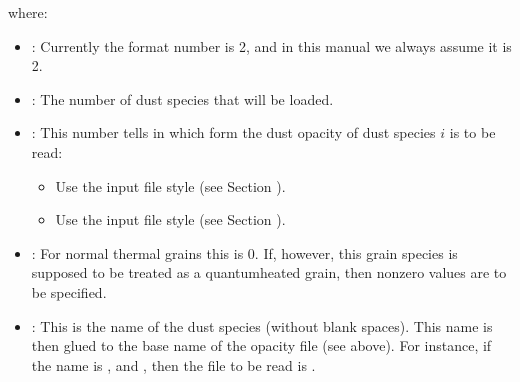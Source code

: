 \documentclass[letterpaper,10pt,english]{sphinxmanual}
\begin{document}
where:
\begin{itemize}
\item {} 
: Currently the format number is 2, and in this manual
we always assume it is 2.

\item {} 
: The number of dust species that will be loaded.

\item {} 
: This number tells in which form the dust
opacity of dust species \(i\) is to be read:
\begin{itemize}
\item {} 
 Use the  input file
style (see Section {\hyperref[\detokenize{inputoutputfiles:sec-dustkappa-files}]{}}).

\item {} 
 Use the  input
file style (see Section {\hyperref[\detokenize{inputoutputfiles:sec-dustkapscatmat-files}]{}}).

\end{itemize}

\item {} 
: For normal thermal grains this is 0. If,
however, this grain species is supposed to be treated as a quantum\sphinxhyphen{}heated
grain, then non\sphinxhyphen{}zero values are to be specified. 

\item {} 
: This is the name of the
dust species (without blank spaces). This name is then glued to the base
name of the opacity file (see above). For instance, if the name is
, and , then the file to be
read is .

\end{itemize}
\end{document}
